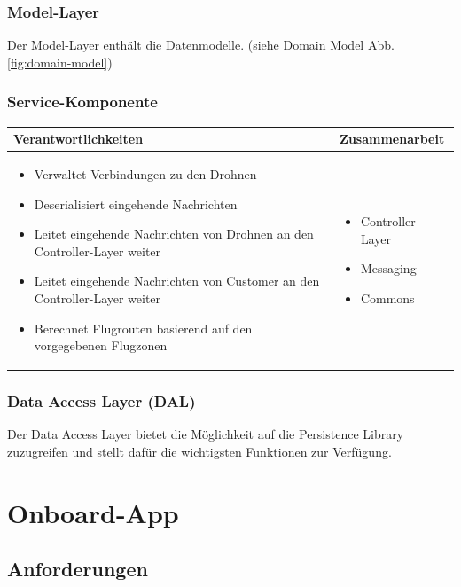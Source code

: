\subsubsection{Model-Layer}

Der Model-Layer enthält die Datenmodelle. (siehe Domain Model Abb. \ref{fig:domain-model})

\subsubsection{Service-Komponente}

\begin{tabular}{|p{}|p{}|} \hline
	\textbf{Verantwortlichkeiten} & \textbf{Zusammenarbeit} \\ \hline \hline
	
	\begin{itemize}
		\item Verwaltet Verbindungen zu den Drohnen
		\item Deserialisiert eingehende Nachrichten
		\item Leitet eingehende Nachrichten von Drohnen an den Controller-Layer weiter	
		\item Leitet eingehende Nachrichten von Customer an den Controller-Layer weiter	
		\item Berechnet Flugrouten basierend auf den vorgegebenen Flugzonen
	\end{itemize}&
	\begin{itemize}
		\item Controller-Layer
		\item Messaging
		\item Commons
	\end{itemize}
	\\ \hline
\end{tabular}

\subsubsection{Data Access Layer (DAL)}

Der Data Access Layer bietet die Möglichkeit auf die Persistence Library zuzugreifen und stellt dafür die wichtigsten Funktionen zur Verfügung. 

\section{Onboard-App}

\subsection{Anforderungen}

